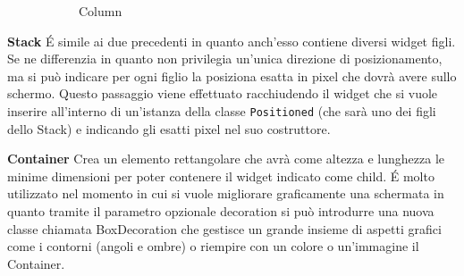 \begin{trivlist}
\begin{figure}[h!]
\begin{subfigure}{0.3\linewidth}
				\caption{Column}
			\end{subfigure}
			\caption{}
			\label{rowColumn}
		\end{figure} 
		\item \textbf{Stack} \newline
		\'E simile ai due precedenti in quanto anch'esso contiene diversi widget
		figli. Se ne differenzia in quanto non privilegia un'unica direzione di
		posizionamento, ma si può indicare per ogni figlio la posiziona esatta
		in pixel che dovrà avere sullo schermo. Questo passaggio viene
		effettuato racchiudendo il widget che si vuole inserire all'interno di
		un'istanza della classe \verb|Positioned| (che sarà uno dei figli dello Stack)
		e indicando gli esatti pixel nel suo costruttore. 
		\item \textbf{Container} \newline
		Crea un elemento rettangolare che avrà come altezza e lunghezza le
		minime dimensioni per poter contenere il widget indicato come child. \'E
		molto utilizzato nel momento in cui si vuole migliorare graficamente una
		schermata in quanto tramite il parametro opzionale decoration si può
		introdurre una nuova classe chiamata BoxDecoration che gestisce un
		grande insieme di aspetti grafici come i contorni (angoli e
		ombre) o riempire con un colore o un'immagine il Container.
	\end{trivlist}

